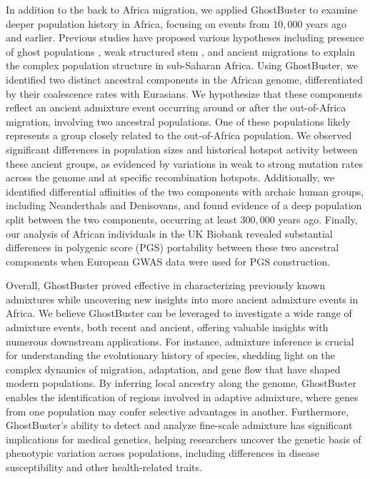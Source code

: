 In addition to the back to Africa migration, we applied GhostBuster to examine deeper population history in Africa, focusing on events from $10{,}000$ years ago and earlier. Previous studies have proposed various hypotheses including presence of ghost populations \cite{skoglund2017reconstructing,durvasula2020recovering}, weak structured stem \cite{ragsdale2023weakly}, and ancient migrations \cite{lipson2020ancient} to explain the complex population structure in sub-Saharan Africa. Using GhostBuster, we identified two distinct ancestral components in the African genome, differentiated by their coalescence rates with Eurasians. We hypothesize that these components reflect an ancient admixture event occurring around or after the out-of-Africa migration, involving two ancestral populations. One of these populations likely represents a group closely related to the out-of-Africa population. We observed significant differences in population sizes and historical hotspot activity between these ancient groups, as evidenced by variations in weak to strong mutation rates across the genome and at specific recombination hotspots. Additionally, we identified differential affinities of the two components with archaic human groups, including Neanderthals and Denisovans, and found evidence of a deep population split between the two components, occurring at least $300{,}000$ years ago. Finally, our analysis of African individuals in the UK Biobank revealed substantial differences in polygenic score (PGS) portability between these two ancestral components when European GWAS data were used for PGS construction.

Overall, GhostBuster proved effective in characterizing previously known admixtures while uncovering new insights into more ancient admixture events in Africa. We believe GhostBuster can be leveraged to investigate a wide range of admixture events, both recent and ancient, offering valuable insights with numerous downstream applications. For instance, admixture inference is crucial for understanding the evolutionary history of species, shedding light on the complex dynamics of migration, adaptation, and gene flow that have shaped modern populations. By inferring local ancestry along the genome, GhostBuster enables the identification of regions involved in adaptive admixture, where genes from one population may confer selective advantages in another. Furthermore, GhostBuster’s ability to detect and analyze fine-scale admixture has significant implications for medical genetics, helping researchers uncover the genetic basis of phenotypic variation across populations, including differences in disease susceptibility and other health-related traits.


